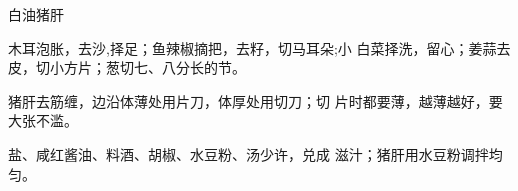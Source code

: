 \begin{recipe}{白油猪肝}

\ingredients


\cooking

\step 	木耳泡胀，去沙,择足；鱼辣椒摘把，去籽，切马耳朵;小 白菜择洗，留心；姜蒜去皮，切小方片；葱切七、八分长的节。

\step 	猪肝去筋缠，边沿体薄处用片刀，体厚处用切刀；切 片时都要薄，越薄越好，要大张不滥。

\step 	盐、咸红酱油、料酒、胡椒、水豆粉、汤少许，兑成 滋汁；猪肝用水豆粉调拌均匀。

\notes

\notes

\end{recipe}

